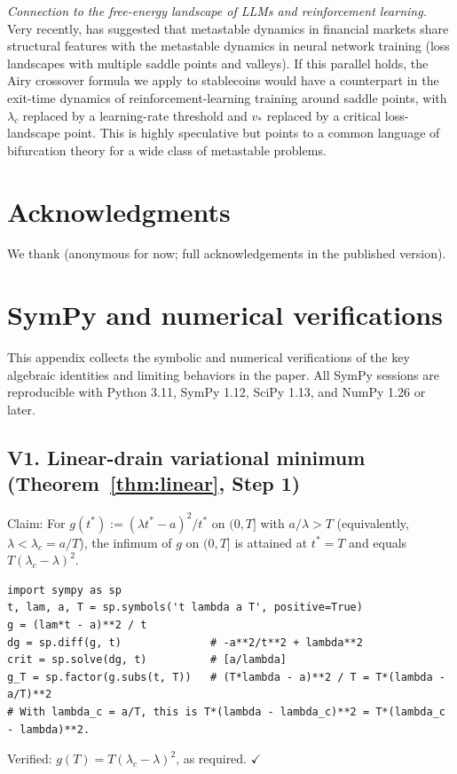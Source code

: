 \documentclass[11pt,a4paper]{article}
\theoremstyle{plain}
\theoremstyle{definition}
\begin{document}
\emph{Connection to the free-energy landscape of LLMs and reinforcement learning.} Very recently, \cite{Halperin2025} has suggested that metastable dynamics in financial markets share structural features with the metastable dynamics in neural network training (loss landscapes with multiple saddle points and valleys). If this parallel holds, the Airy crossover formula we apply to stablecoins would have a counterpart in the exit-time dynamics of reinforcement-learning training around saddle points, with $\lambda_c$ replaced by a learning-rate threshold and $v_*$ replaced by a critical loss-landscape point. This is highly speculative but points to a common language of bifurcation theory for a wide class of metastable problems.

\section*{Acknowledgments}

We thank (anonymous for now; full acknowledgements in the published version).

\appendix

\section{SymPy and numerical verifications}
\label{app:sympy}

This appendix collects the symbolic and numerical verifications of the key algebraic identities and limiting behaviors in the paper. All SymPy sessions are reproducible with Python 3.11, SymPy 1.12, SciPy 1.13, and NumPy 1.26 or later.

\subsection*{V1. Linear-drain variational minimum (Theorem~\ref{thm:linear}, Step 1)}

Claim: For $g(t^*) := (\lambda t^* - a)^2/t^*$ on $(0, T]$ with $a/\lambda > T$ (equivalently, $\lambda < \lambda_c = a/T$), the infimum of $g$ on $(0, T]$ is attained at $t^* = T$ and equals $T(\lambda_c - \lambda)^2$.

\begin{verbatim}
import sympy as sp
t, lam, a, T = sp.symbols('t lambda a T', positive=True)
g = (lam*t - a)**2 / t
dg = sp.diff(g, t)              # -a**2/t**2 + lambda**2
crit = sp.solve(dg, t)          # [a/lambda]
g_T = sp.factor(g.subs(t, T))   # (T*lambda - a)**2 / T = T*(lambda - a/T)**2
# With lambda_c = a/T, this is T*(lambda - lambda_c)**2 = T*(lambda_c - lambda)**2.
\end{verbatim}
Verified: $g(T) = T(\lambda_c - \lambda)^2$, as required. $\checkmark$
\end{document}

